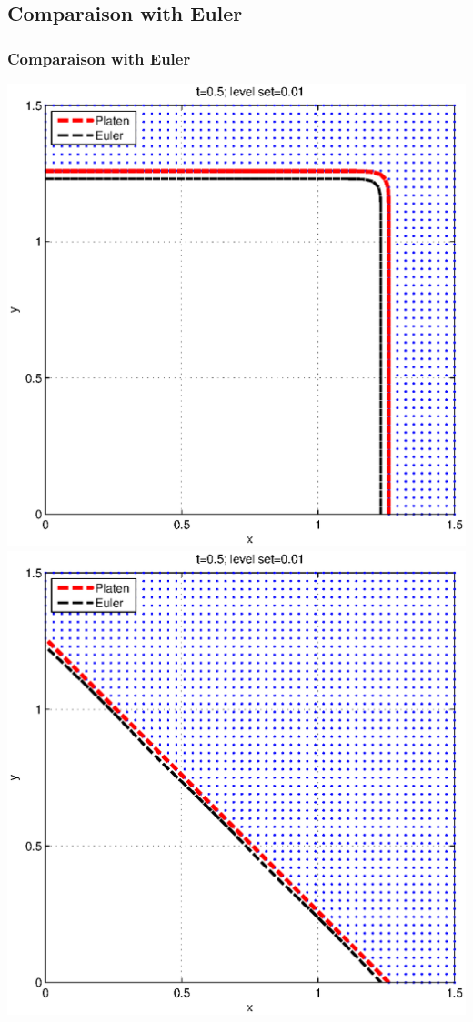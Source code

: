 \documentclass[]{beamer}
\begin{document}
\subsection{Comparaison with Euler}
\begin{frame}
\frametitle{Comparaison with Euler}
\includegraphics[scale=0.3]{put_max_vs.eps}
\includegraphics[scale=0.3]{put_weighted_vs.eps}
\end{frame}
\end{document}
